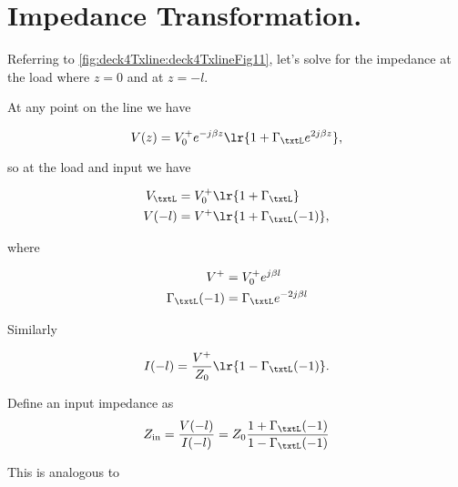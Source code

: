 \section{Impedance Transformation.}

Referring to \cref{fig:deck4Txline:deck4TxlineFig11}, let's solve for the impedance at the load where \( z = 0 \) and at \( z = -l \).


At any point on the line we have

\begin{dmath}\label{eqn:uwaves4TransmissionLinesCore:1320}
V(z) = V_0^{+} e^{-j \beta z} \lr{ 1 + \Gamma_\txtL e^{2 j \beta z} },
\end{dmath}

so at the load and input we have

\begin{equation}\label{eqn:uwaves4TransmissionLinesCore:1340}
\begin{aligned}
V_\txtL &= V_0^{+} \lr{ 1 + \Gamma_\txtL } \\
V(-l) &= V^{+} \lr{ 1 + \Gamma_\txtL(-1) },
\end{aligned}
\end{equation}

where

\begin{equation}\label{eqn:uwaves4TransmissionLinesCore:1360}
\begin{aligned}
V^{+} &= V_0^{+} e^{ j \beta l } \\
\Gamma_\txtL(-1) &= \Gamma_\txtL e^{-2 j \beta l} 
\end{aligned}
\end{equation}

Similarly 

\begin{equation}\label{eqn:uwaves4TransmissionLinesCore:1380}
I(-l) = \frac{V^{+}}{Z_0} \lr{ 1 - \Gamma_\txtL(-1) }.
\end{equation}

Define an input impedance as
\begin{dmath}\label{eqn:uwaves4TransmissionLinesCore:1400}
Z_{\textrm{in}} 
= \frac{V(-l)}{I(-l)}
= Z_0 \frac{1 + \Gamma_\txtL(-1)}{1 - \Gamma_\txtL(-1)}
\end{dmath}

This is analogous to 

